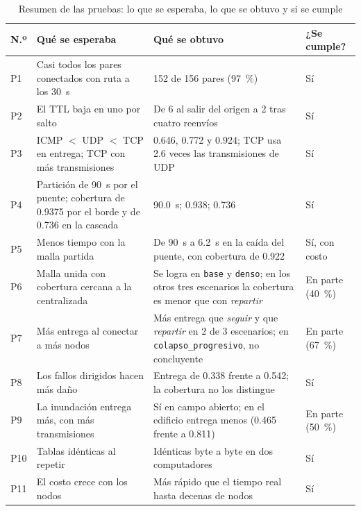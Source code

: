 \begin{table}[htbp!]
    \centering
    \caption{Resumen de las pruebas: lo que se esperaba, lo que se obtuvo y si se cumple}
    \label{tab:resumen-pruebas}
    \footnotesize
    \begin{tabular}{|p{0.6cm}|p{4.4cm}|p{6.6cm}|p{1.6cm}|}
        \hline
        \textbf{N.º} & \textbf{Qué se esperaba} & \textbf{Qué se obtuvo} & \textbf{¿Se cumple?} \\
        \hline
        P1 & Casi todos los pares conectados con ruta a los 30~s & 152 de 156 pares (97~\%) & Sí \\
        \hline
        P2 & El TTL baja en uno por salto & De 6 al salir del origen a 2 tras cuatro reenvíos & Sí \\
        \hline
        P3 & ICMP $<$ UDP $<$ TCP en entrega; TCP con más transmisiones & 0.646, 0.772 y 0.924; TCP usa 2.6 veces las transmisiones de UDP & Sí \\
        \hline
        P4 & Partición de 90~s por el puente; cobertura de 0.9375 por el borde y de 0.736 en la cascada & 90.0~s; 0.938; 0.736 & Sí \\
        \hline
        P5 & Menos tiempo con la malla partida & De 90~s a 6.2~s en la caída del puente, con cobertura de 0.922 & Sí, con costo \\
        \hline
        P6 & Malla unida con cobertura cercana a la centralizada & Se logra en \texttt{base} y \texttt{denso}; en los otros tres escenarios la cobertura es menor que con \textit{repartir} & En parte (40~\%) \\
        \hline
        P7 & Más entrega al conectar a más nodos & Más entrega que \textit{seguir} y que \textit{repartir} en 2 de 3 escenarios; en \texttt{colapso\_progresivo}, no concluyente & En parte (67~\%) \\
        \hline
        P8 & Los fallos dirigidos hacen más daño & Entrega de 0.338 frente a 0.542; la cobertura no los distingue & Sí \\
        \hline
        P9 & La inundación entrega más, con más transmisiones & Sí en campo abierto; en el edificio entrega menos (0.465 frente a 0.811) & En parte (50~\%) \\
        \hline
        P10 & Tablas idénticas al repetir & Idénticas byte a byte en dos computadores & Sí \\
        \hline
        P11 & El costo crece con los nodos & Más rápido que el tiempo real hasta decenas de nodos & Sí \\
        \hline
    \end{tabular}
\end{table}

